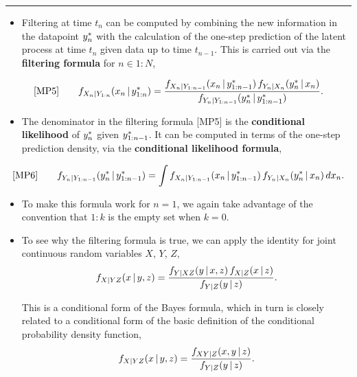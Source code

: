 \documentclass[]{article}
\providecommand{\tightlist}{%
  \setlength{\itemsep}{0pt}\setlength{\parskip}{0pt}}
\begin{document}
\begin{center}\rule{0.5\linewidth}{\linethickness}\end{center}

\begin{itemize}
\tightlist
\item
  Filtering at time \(t_n\) can be computed by combining the new
  information in the datapoint \(y_{n}^*\) with the calculation of
  the one-step prediction of the latent process at time \(t_{n}\) given
  data up to time \(t_{n-1}\). This is carried out via the
  \textbf{filtering formula} for \(n\in 1:N\),
\end{itemize}

$$\text{[MP5]}
\quad\quad \displaystyle f_{X_{n}|Y_{1:n}}(x_{n}{\, | \,} y_{1:n}^*) = \frac{ f_{X_{n}|Y_{1:n-1}}(x_{n}{\, | \,} y_{1:n-1}^*)\, f_{Y_n|X_n}(y_n^*{\, | \,} x_n) }{ f_{Y_{n}|Y_{1:n-1}}(y_n^*{\, | \,} y_{1:n-1}^*) }.$$

\begin{itemize}
\tightlist
\item
  The denominator in the filtering formula {[}MP5{]} is the
  \textbf{conditional likelihood} of \(y_{n}^*\) given
  \(y_{1:n-1}^*\). It can be computed in terms of the one-step
  prediction density, via the \textbf{conditional likelihood formula},
\end{itemize}

$$\text{[MP6]}
\quad\quad \displaystyle f_{Y_{n}|Y_{1:n-1}}(y_n^*{\, | \,} y_{1:n-1}^*) = \int f_{X_{n}|Y_{1:n-1}}(x_{n}{\, | \,} y_{1:n-1}^*)\, f_{Y_n|X_n}(y_n^*{\, | \,} x_n)\, dx_n.$$


\begin{itemize}
\item
  To make this formula work for \(n=1\), we again take advantage of the
  convention that \(1:k\) is the empty set when \(k=0\).
\item
  To see why the filtering formula is true, we can apply the identity
  for joint continuous random variables \(X\), \(Y\), \(Z\),
  \[f_{X|YZ}(x{\, | \,} y,z)= \frac{ f_{Y|XZ}(y{\, | \,} x,z)\, f_{X|Z}(x{\, | \,} z)}{f_{Y|Z}(y{\, | \,} z)}.\]
  
  
  This is a conditional form of the Bayes formula, which in turn is
  closely related to a conditional form of the basic definition of the
  conditional probability density function,
  \[f_{X|YZ}(x{\, | \,} y,z)= \frac{f_{XY|Z}(x,y{\, | \,} z)}{f_{Y|Z}(y{\, | \,} z)}.\]
\end{itemize}
\end{document}
